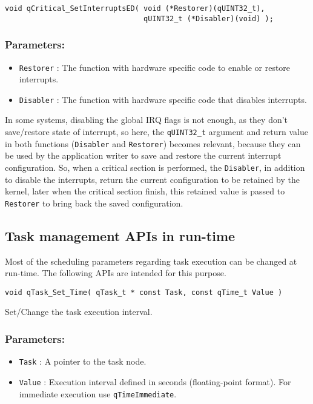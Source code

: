 \begin{lstlisting}[style=CStyle]
void qCritical_SetInterruptsED( void (*Restorer)(qUINT32_t), 
                                qUINT32_t (*Disabler)(void) );
\end{lstlisting}

\subsubsection*{Parameters:}
\begin{itemize}
    \item \lstinline{Restorer} : The function with hardware specific code to enable or restore interrupts.
    \item \lstinline{Disabler} : The function with hardware specific code that disables interrupts.
\end{itemize}

In some systems, disabling the global IRQ flags is not enough, as they don't save/restore state of interrupt, so here, the \lstinline{qUINT32_t} argument and return value in both functions (\lstinline{Disabler} and \lstinline{Restorer}) becomes relevant, because they can be used by the application writer to save and restore the current interrupt configuration. So, when a critical section is performed, the \lstinline{Disabler}, in addition to disable the interrupts, return the current configuration to be retained by the kernel, later when the critical section finish, this retained value is passed to \lstinline{Restorer} to bring back the saved configuration. 

\subsection{Task management APIs in run-time }
Most of the scheduling parameters regarding task execution can be changed at run-time. The following APIs are intended for this purpose. \\


\begin{lstlisting}[style=CStyle]
void qTask_Set_Time( qTask_t * const Task, const qTime_t Value )
\end{lstlisting}

Set/Change the task execution interval. 

\subsubsection*{Parameters:}
\begin{itemize}
    \item \lstinline{Task} : A pointer to the task node.
    \item \lstinline{Value} : Execution interval defined in seconds (floating-point format). For immediate execution use \lstinline{qTimeImmediate}.
\end{itemize}

